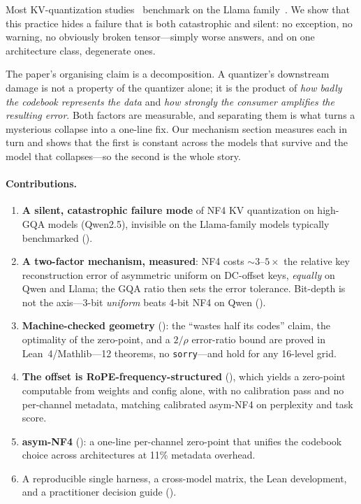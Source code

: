 \documentclass{article}
\theoremstyle{plain}
\theoremstyle{definition}
\begin{document}
Most KV-quantization studies~\citep{hooper2024kvquant,liu2024kivi,zhang2023h2o} benchmark on the
Llama family~\citep{touvron2023llama2}. We show that this practice hides a failure that is both
catastrophic and silent: no exception, no warning, no obviously broken tensor---simply worse
answers, and on one architecture class, degenerate ones.

The paper's organising claim is a decomposition. A quantizer's downstream damage is not a
property of the quantizer alone; it is the product of \emph{how badly the codebook represents
the data} and \emph{how strongly the consumer amplifies the resulting error}. Both factors are
measurable, and separating them is what turns a mysterious collapse into a one-line fix. Our
mechanism section measures each in turn and shows that the first is constant across the models
that survive and the model that collapses---so the second is the whole story.

\paragraph{Contributions.}
\begin{enumerate}
  \item \textbf{A silent, catastrophic failure mode} of NF4 KV quantization on high-GQA models
        (Qwen2.5), invisible on the Llama-family models typically benchmarked
        ().
  \item \textbf{A two-factor mechanism, measured}: NF4 costs ${\sim}3$--$5\times$ the relative
        key reconstruction error of asymmetric uniform on DC-offset keys, \emph{equally} on
        Qwen and Llama; the GQA ratio then sets the error tolerance. Bit-depth is not the
        axis---3-bit \emph{uniform} beats 4-bit NF4 on Qwen ().
  \item \textbf{Machine-checked geometry} (): the ``wastes half its codes''
        claim, the optimality of the zero-point, and a $2/\rho$ error-ratio bound are proved in
        Lean~4/Mathlib---12 theorems, no \texttt{sorry}---and hold for any 16-level grid.
  \item \textbf{The offset is RoPE-frequency-structured} (), which yields a
        zero-point computable from weights and config alone, with no calibration pass and no
        per-channel metadata, matching calibrated asym-NF4 on perplexity and task score.
  \item \textbf{asym-NF4} (): a one-line per-channel zero-point that unifies
        the codebook choice across architectures at 11\% metadata overhead.
  \item A reproducible single harness, a cross-model matrix, the Lean development, and a
        practitioner decision guide ().
\end{enumerate}
\end{document}
